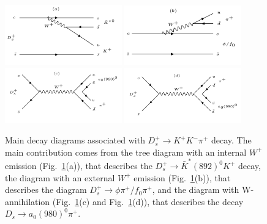 {\begin{table}[htbp]
\begin{center}
\begin{tabular}{cccccccc}
                \hline
                \bottomrule\bottomrule
            \end{tabular}
        \end{center}
    \end{table}
    \begin{figure}[htbp]
        \centering
        \includegraphics[width=0.45\textwidth]{plot/Fa.PNG}
        \includegraphics[width=0.45\textwidth]{plot/Fb.PNG}
        \includegraphics[width=0.45\textwidth]{plot/Fc.PNG}
        \includegraphics[width=0.45\textwidth]{plot/Fd.PNG}
        \caption{
        Main decay diagrams associated with $D_{s}^{+} \rightarrow K^{+}K^{-}\pi^{+}$ decay.
    The main contribution comes from the tree diagram with an internal $W^{+}$ emission (Fig.~\ref{Feynman-dia}(a)), that describes the $D_{s}^{+} \rightarrow \bar{K}^{*}(892)^{0}K^{+}$ decay, 
    the diagram with an external $W^{+}$ emission (Fig.~\ref{Feynman-dia}(b)), that describes the diagram $D_{s}^{+} \rightarrow \phi\pi^{+}/ f_{0}\pi^{+}$, 
    and the diagram with W-annihilation (Fig.~\ref{Feynman-dia}(c) and Fig.~\ref{Feynman-dia}(d)), that describes the decay $D_{s} \rightarrow a_{0}(980)^{0}\pi^{+}$.
    }
        \label{Feynman-dia}
    \end{figure}
    
    
}
    
